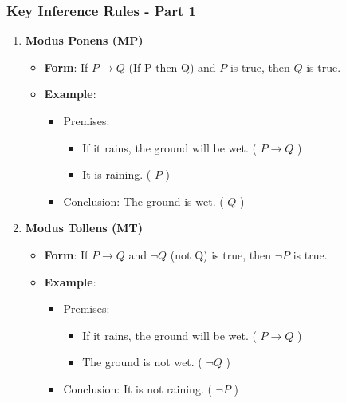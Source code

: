 \documentclass[aspectratio=169]{beamer}
\begin{document}
\begin{frame}[fragile]
  \frametitle{Key Inference Rules - Part 1}
  \begin{enumerate}
    \item \textbf{Modus Ponens (MP)}  
      \begin{itemize}
        \item \textbf{Form}: If \( P \rightarrow Q \) (If P then Q) and \( P \) is true, then \( Q \) is true.
        \item \textbf{Example}:
        \begin{itemize}
          \item Premises:  
            \begin{itemize}
              \item If it rains, the ground will be wet. ( \( P \rightarrow Q \) )  
              \item It is raining. ( \( P \) )
            \end{itemize}
          \item Conclusion: The ground is wet. ( \( Q \) )
        \end{itemize}
      \end{itemize}
    
    \item \textbf{Modus Tollens (MT)}  
      \begin{itemize}
        \item \textbf{Form}: If \( P \rightarrow Q \) and \( \neg Q \) (not Q) is true, then \( \neg P \) is true.
        \item \textbf{Example}:
        \begin{itemize}
          \item Premises:  
            \begin{itemize}
              \item If it rains, the ground will be wet. ( \( P \rightarrow Q \) )  
              \item The ground is not wet. ( \( \neg Q \) )
            \end{itemize}
          \item Conclusion: It is not raining. ( \( \neg P \) )
        \end{itemize}
      \end{itemize}
  \end{enumerate}
\end{frame}
\end{document}
